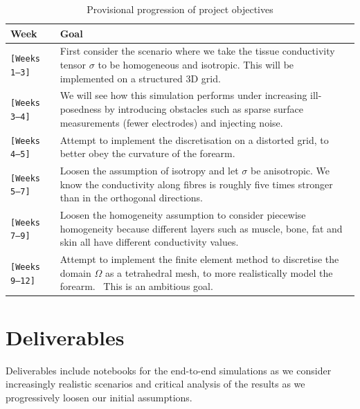 \documentclass[project-plan]{report-template}
\begin{document}
\begin{table}[ht]
\centering
\caption{Provisional progression of project objectives}
\label{tab:project-plan}
\begin{tabularx}{\textwidth}{@{}lX@{}}
\toprule
\textbf{Week} & \textbf{Goal} \\
\midrule
\texttt{[Weeks 1--3]} & First consider the scenario where we take the tissue conductivity tensor $\sigma$ to be homogeneous and isotropic. This will be implemented on a structured 3D grid. \\
\addlinespace
\texttt{[Weeks 3--4]} & We will see how this simulation performs under increasing ill-posedness by introducing obstacles such as sparse surface measurements (fewer electrodes) and injecting noise. \\
\addlinespace
\texttt{[Weeks 4--5]} & Attempt to implement the discretisation on a distorted grid, to better obey the curvature of the forearm. \\
\addlinespace
\texttt{[Weeks 5--7]} & Loosen the assumption of isotropy and let $\sigma$ be anisotropic. We know the conductivity along fibres is roughly five times stronger than in the orthogonal directions.~\cite{mesin2013}\\
\addlinespace
\texttt{[Weeks 7--9]} & Loosen the homogeneity assumption to consider piecewise homogeneity because different layers such as muscle, bone, fat and skin all have different conductivity values. \\
\addlinespace
\texttt{[Weeks 9--12]} & Attempt to implement the finite element method to discretise the domain $\Omega$ as a tetrahedral mesh, to more realistically model the forearm.~\cite{knabner2003} This is an ambitious goal.\\
\bottomrule
\end{tabularx}
\end{table}

\section{Deliverables}

 Deliverables include notebooks for the end-to-end simulations as we consider increasingly realistic scenarios and critical analysis of the results as we progressively loosen our initial assumptions.


 
\end{document}
